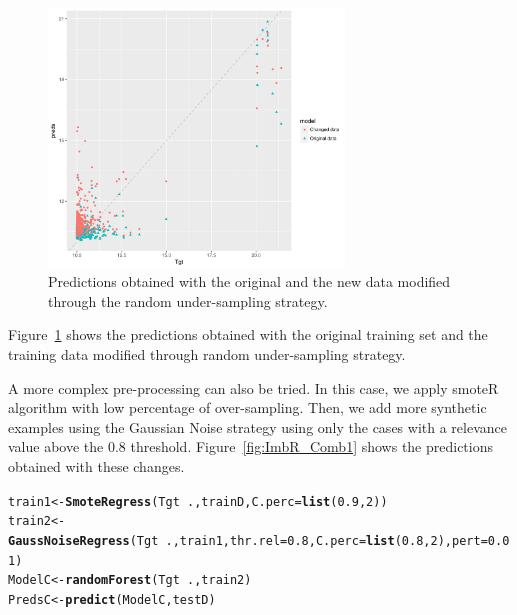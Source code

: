 \documentclass[10pt,a4paper]{article}\usepackage[]{graphicx}\usepackage[]{color}
\makeatletter
\newcommand{\hlnum}[1]{\textcolor[rgb]{0.686,0.059,0.569}{#1}}%
\newcommand{\hlopt}[1]{\textcolor[rgb]{0,0,0}{#1}}%
\newcommand{\hlstd}[1]{\textcolor[rgb]{0.345,0.345,0.345}{#1}}%
\newcommand{\hlkwb}[1]{\textcolor[rgb]{0.69,0.353,0.396}{#1}}%
\newcommand{\hlkwc}[1]{\textcolor[rgb]{0.333,0.667,0.333}{#1}}%
\newcommand{\hlkwd}[1]{\textcolor[rgb]{0.737,0.353,0.396}{\textbf{#1}}}%
\newenvironment{kframe}{%
 \def\at@end@of@kframe{}%
 \ifinner\ifhmode%
  \def\at@end@of@kframe{\end{minipage}}%
  \begin{minipage}{\columnwidth}%
 \fi\fi%
 \def\FrameCommand##1{\hskip\@totalleftmargin \hskip-\fboxsep
 \colorbox{shadecolor}{##1}\hskip-\fboxsep
     \hskip-\linewidth \hskip-\@totalleftmargin \hskip\columnwidth}%
 \MakeFramed {\advance\hsize-\width
   \@totalleftmargin\z@ \linewidth\hsize
   \@setminipage}}%
 {\par\unskip\endMakeFramed%
 \at@end@of@kframe}
\newenvironment{knitrout}{}{} %
\makeatother
\begin{document}
\begin{knitrout}\footnotesize
{}\color{fgcolor}\begin{figure}

{\centering \includegraphics[width=0.7\textwidth]{figures/UBL-ImbR_RU1-1} 

}

\caption[Predictions obtained with the original and the new data modified through the random under-sampling strategy]{Predictions obtained with the original and the new data modified through the random under-sampling strategy.}\label{fig:ImbR_RU1}
\end{figure}


\end{knitrout}



Figure~\ref{fig:ImbR_RU1} shows the predictions obtained with the original training set and the training data modified through random under-sampling strategy.


A more complex pre-processing can also be tried. In this case, we apply smoteR algorithm with low percentage of over-sampling. Then, we add more synthetic examples using the Gaussian Noise strategy using only the cases with a relevance value above the 0.8 threshold. Figure~\ref{fig:ImbR_Comb1} shows the predictions obtained with these changes.

\begin{knitrout}\footnotesize
{}\color{fgcolor}\begin{kframe}
\begin{alltt}
\hlstd{train1} \hlkwb{<-} \hlkwd{SmoteRegress}\hlstd{(Tgt}\hlopt{~}\hlstd{., trainD,} \hlkwc{C.perc}\hlstd{=}\hlkwd{list}\hlstd{(}\hlnum{0.9}\hlstd{,} \hlnum{2}\hlstd{))}
\hlstd{train2} \hlkwb{<-} \hlkwd{GaussNoiseRegress}\hlstd{(Tgt}\hlopt{~}\hlstd{., train1,} \hlkwc{thr.rel}\hlstd{=}\hlnum{0.8}\hlstd{,} \hlkwc{C.perc}\hlstd{=}\hlkwd{list}\hlstd{(}\hlnum{0.8}\hlstd{,} \hlnum{2}\hlstd{),} \hlkwc{pert}\hlstd{=}\hlnum{0.01}\hlstd{)}
\hlstd{ModelC} \hlkwb{<-}\hlkwd{randomForest}\hlstd{(Tgt}\hlopt{~}\hlstd{., train2)}
\hlstd{PredsC} \hlkwb{<-} \hlkwd{predict}\hlstd{(ModelC, testD)}
\end{alltt}
\end{kframe}
\end{knitrout}
\end{document}
